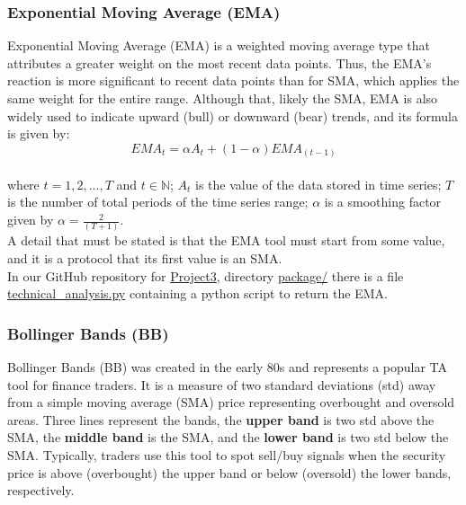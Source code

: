 \subsubsection{Exponential Moving Average (EMA)}
\label{chap:Exponential Moving Average (EMA)}

\quad Exponential Moving Average (EMA) is a weighted moving average type that attributes a greater weight on the most recent data points. Thus, the EMA's reaction is more significant to recent data points than for SMA, which applies the same weight for the entire range. Although that, likely the SMA, EMA is also widely used to indicate upward (bull) or downward (bear) trends, and its formula is given by:\\

$${EMA}_t = \alpha A_t + (1 - \alpha) EMA_{(t-1)}$$\\

\noindent where $t = 1, 2, ..., T$ and $t \in \mathbb{N}$; $A_t$ is the value of the data stored in time series; $T$ is the number of total periods of the time series range; $\alpha$ is a smoothing factor given by $\alpha = \frac{2}{(T+1)}$.\\

A detail that must be stated is that the EMA tool must start from some value, and it is a protocol that its first value is an SMA.\\

In our GitHub repository for \href{https://github.com/fabiorodp/UiO-FYS-STK4155/tree/master/Project3}{Project3}, directory \href{https://github.com/fabiorodp/UiO-FYS-STK4155/tree/master/Project3/package/}{package/} there is a file \href{https://github.com/fabiorodp/UiO-FYS-STK4155/tree/master/Project3/package/technical_analysis.py}{technical\_analysis.py} containing a python script to return the EMA.

\subsubsection{Bollinger Bands (BB)}
\label{chap:Bollinger Bands (BB)}

\quad Bollinger Bands (BB) was created in the early 80s and represents a popular TA tool for finance traders. It is a measure of two standard deviations (std) away from a simple moving average (SMA) price representing overbought and oversold areas. Three lines represent the bands, the \textbf{upper band} is two std above the SMA, the \textbf{middle band} is the SMA, and the \textbf{lower band} is two std below the SMA. Typically, traders use this tool to spot sell/buy signals when the security price is above (overbought) the upper band or below (oversold) the lower bands, respectively.\\

